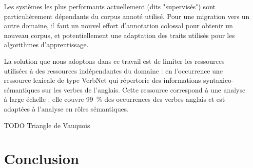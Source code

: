 \documentclass[oneside]{scrbook}
\begin{document}
Les systèmes les plus performants actuellement (dits "supervisés") sont particulièrement dépendants du corpus annoté utilisé. Pour une migration vers un autre domaine, il faut un nouvel effort d'annotation colossal pour obtenir un nouveau corpus, et potentiellement une adaptation des traits utilisés pour les algorithmes d'apprentissage.

La solution que nous adoptons dans ce travail est de limiter les ressources utilisées à des ressources indépendantes du domaine : en l'occurrence une ressource lexicale de type VerbNet qui répertorie des informations syntaxico-sémantiques sur les verbes de l'anglais. Cette ressource correspond à une analyse à large échelle : elle couvre 99~\% des occurrences des verbes anglais \citep[partie 1, p~.53]{palmer2013semantic} et est adaptées à l'analyse en rôles sémantiques.

TODO Triangle de Vauquois





\chapter{Conclusion} 
\label{ch:conc} 

\backmatter 





\end{document}
